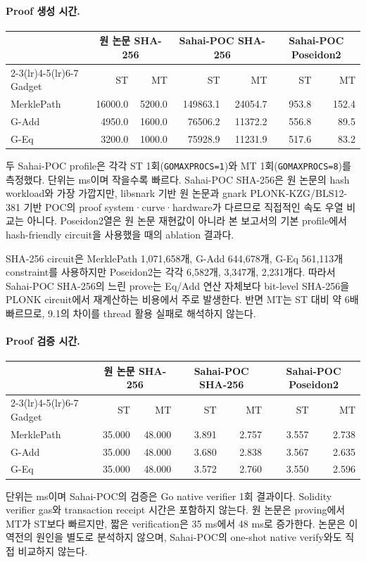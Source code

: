 \documentclass[10pt]{article}
\begin{document}
\paragraph{Proof 생성 시간.}
{\small\setlength{\tabcolsep}{3pt}
\begin{longtable}{lrrrrrr}
\toprule & \multicolumn{2}{c}{원 논문 SHA-256} & \multicolumn{2}{c}{Sahai-POC SHA-256} & \multicolumn{2}{c}{Sahai-POC Poseidon2}\\
\cmidrule(lr){2-3}\cmidrule(lr){4-5}\cmidrule(lr){6-7}
Gadget & ST & MT & ST & MT & ST & MT\\
\midrule\endhead
MerklePath & 16000.0 & 5200.0 & 149863.1 & 24054.7 & 953.8 & 152.4\\
G-Add & 4950.0 & 1600.0 & 76506.2 & 11372.2 & 556.8 & 89.5\\
G-Eq & 3200.0 & 1000.0 & 75928.9 & 11231.9 & 517.6 & 83.2\\
\bottomrule\end{longtable}
}
두 Sahai-POC profile은 각각 ST 1회(\texttt{GOMAXPROCS=1})와 MT 1회(\texttt{GOMAXPROCS=8})를 측정했다. 단위는 ms이며 작을수록 빠르다. Sahai-POC SHA-256은 원 논문의 hash workload와 가장 가깝지만, libsnark 기반 원 논문과 gnark PLONK-KZG/BLS12-381 기반 POC의 proof system·curve·hardware가 다르므로 직접적인 속도 우열 비교는 아니다. Poseidon2열은 원 논문 재현값이 아니라 본 보고서의 기본 profile에서 hash-friendly circuit을 사용했을 때의 ablation 결과다.

SHA-256 circuit은 MerklePath 1,071,658개, G-Add 644,678개, G-Eq 561,113개 constraint를 사용하지만 Poseidon2는 각각 6,582개, 3,347개, 2,231개다. 따라서 Sahai-POC SHA-256의 느린 prove는 Eq/Add 연산 자체보다 bit-level SHA-256을 PLONK circuit에서 재계산하는 비용에서 주로 발생한다. 반면 MT는 ST 대비 약 6배 빠르므로, 9.1의 차이를 thread 활용 실패로 해석하지 않는다.

\paragraph{Proof 검증 시간.}
{\small\setlength{\tabcolsep}{3pt}
\begin{longtable}{lrrrrrr}
\toprule & \multicolumn{2}{c}{원 논문 SHA-256} & \multicolumn{2}{c}{Sahai-POC SHA-256} & \multicolumn{2}{c}{Sahai-POC Poseidon2}\\
\cmidrule(lr){2-3}\cmidrule(lr){4-5}\cmidrule(lr){6-7}
Gadget & ST & MT & ST & MT & ST & MT\\
\midrule\endhead
MerklePath & 35.000 & 48.000 & 3.891 & 2.757 & 3.557 & 2.738\\
G-Add & 35.000 & 48.000 & 3.680 & 2.838 & 3.567 & 2.635\\
G-Eq & 35.000 & 48.000 & 3.572 & 2.760 & 3.550 & 2.596\\
\bottomrule\end{longtable}
}
단위는 ms이며 Sahai-POC의 검증은 Go native verifier 1회 결과이다. Solidity verifier gas와 transaction receipt 시간은 포함하지 않는다. 원 논문은 proving에서 MT가 ST보다 빠르지만, 짧은 verification은 35 ms에서 48 ms로 증가한다. 논문은 이 역전의 원인을 별도로 분석하지 않으며, Sahai-POC의 one-shot native verify와도 직접 비교하지 않는다.
\end{document}
